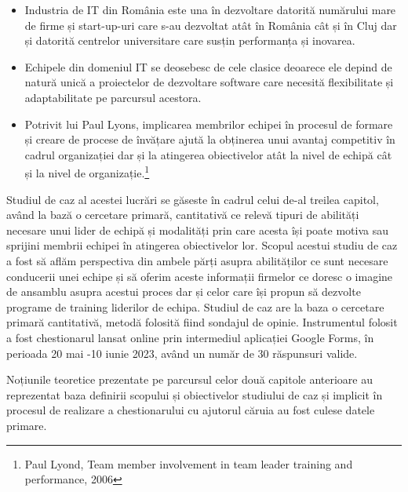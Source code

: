 \documentclass[a4paper, 12pt]{article}
\begin{document}
\begin{itemize}

\item Industria de IT din România este una în dezvoltare datorită numărului mare de firme și start-up-uri care s-au dezvoltat atât în România cât și în Cluj dar și datorită centrelor universitare care susțin performanța și inovarea.

\item Echipele din domeniul IT se deosebesc de cele clasice deoarece ele depind de natură unică a proiectelor de dezvoltare software care necesită flexibilitate și adaptabilitate pe parcursul acestora.

\item Potrivit lui Paul Lyons, implicarea membrilor echipei în procesul de formare și creare de procese de învățare ajută la obținerea unui avantaj competitiv în cadrul organizației dar și la atingerea obiectivelor atât la nivel de echipă cât și la nivel de organizație.\footnote{Paul Lyond, Team member involvement in team leader training and performance, 2006}

\end{itemize}

	\quad Studiul de caz al acestei lucrări se găseste în cadrul celui de-al treilea capitol, având la bază o cercetare primară, cantitativă ce relevă tipuri de abilități necesare unui lider de echipă și modalități prin care acesta își poate motiva sau sprijini membrii echipei în atingerea obiectivelor lor. Scopul acestui studiu de caz a fost să aflăm perspectiva din ambele părți asupra abilităților ce sunt necesare conducerii unei echipe și să oferim aceste informații firmelor ce doresc o imagine de ansamblu asupra acestui proces dar și celor care își propun să dezvolte programe de training liderilor de echipa. Studiul de caz are la baza o cercetare primară cantitativă, metodă folosită fiind sondajul de opinie. Instrumentul folosit a fost chestionarul lansat online prin intermediul aplicației Google Forms, în perioada 20 mai -10 iunie 2023, având un număr de 30 răspunsuri valide.

	\quad Noțiunile teoretice prezentate pe parcursul celor două capitole anterioare au reprezentat baza definirii scopului și obiectivelor studiului de caz și implicit în procesul de realizare a chestionarului cu ajutorul căruia au fost culese datele primare.
\end{document}
